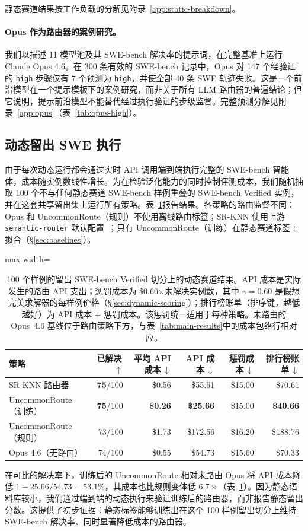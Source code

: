 静态赛道结果按工作负载的分解见附录~\ref{app:static-breakdown}。

\paragraph{Opus 作为路由器的案例研究。}
\label{sec:opus}

我们以描述 11 模型池及其 SWE-bench 解决率的提示词，在完整基准上运行 Claude Opus 4.6。在 300 条有效的 SWE-bench 记录中，Opus 对 147 个经验证的 \texttt{high} 步骤仅有 7 个预测为 \texttt{high}，并使全部 40 条 SWE 轨迹失败。这是一个前沿模型在一个提示模板下的案例研究，而非关于所有 LLM 路由器的普遍结论；但它说明，提示前沿模型不能替代经过执行验证的步级监督。完整预测分解见附录~\ref{app:opus}（表~\ref{tab:opus-high}）。

\subsection{动态留出 SWE 执行}
\label{sec:dynamic-results}

由于每次动态运行都会通过实时 API 调用端到端执行完整的 SWE-bench 智能体，成本随实例数线性增长。为在检验泛化能力的同时控制评测成本，我们随机抽取 100 个不与任何静态赛道 SWE-bench 样例重叠的 SWE-bench Verified 实例，并在这套共享留出集上运行所有策略。表~\ref{tab:dynamic-heldout}报告结果。各策略的路由监督不同：Opus 和 UncommonRoute（规则）不使用离线路由标签；SR-KNN 使用上游 \texttt{semantic-router} 默认配置~\citep{liu2026vllmsemanticrouter}；只有 UncommonRoute（训练）在静态赛道标签上拟合（\S\ref{sec:baselines}）。

\begin{table}[t]
\centering
\small
\begin{adjustbox}{max width=\linewidth}
\begin{tabular}{lrrrrr}
\toprule
策略 & 已解决\,$\uparrow$ & 平均 API 成本\,$\downarrow$ & API 成本\,$\downarrow$ & 惩罚成本\,$\downarrow$ & 排行榜账单\,$\downarrow$ \\
\midrule
SR-KNN 路由器 & \textbf{75}/100 & \$0.56 & \$55.61 & \$15.00 & \$70.61 \\
UncommonRoute（训练） & \textbf{75}/100 & \textbf{\$0.26} & \textbf{\$25.66} & \$15.00 & \textbf{\$40.66} \\
UncommonRoute（规则） & 73/100 & \$1.73 & \$172.56 & \$16.20 & \$188.76 \\
\midrule
Opus 4.6（无路由） & 74/100 & \$0.55 & \$54.73 & \$15.60 & \$70.33 \\
\bottomrule
\end{tabular}
\end{adjustbox}
\caption{100 个样例的留出 SWE-bench Verified 切分上的动态赛道结果。API 成本是实际发生的路由 API 支出；惩罚成本为 \$0.60$\times$未解决实例数，其中 $\gamma{=}0.60$ 是假想完美求解器的每样例价格（\S\ref{sec:dynamic-scoring}）；排行榜账单（排序键，越低越好）为 API 成本 $+$ 惩罚成本。该惩罚统一适用于每种策略。未路由的 Opus~4.6 基线位于路由策略下方，与表~\ref{tab:main-results}中的成本包络行相对应。}
\label{tab:dynamic-heldout}
\end{table}

在可比的解决率下，训练后的 UncommonRoute 相对未路由 Opus 将 API 成本降低 $1-25.66/54.73=53.1\%$，其成本也比规则变体低 $6.7\times$（表~\ref{tab:dynamic-heldout}）。因为静态语料库较小，我们通过端到端的动态执行来验证训练后的路由器，而非报告静态留出分数。这提供了初步证据：静态标签能够训练出在这个 100 样例留出切分上维持 SWE-bench 解决率、同时显著降低成本的路由器。
